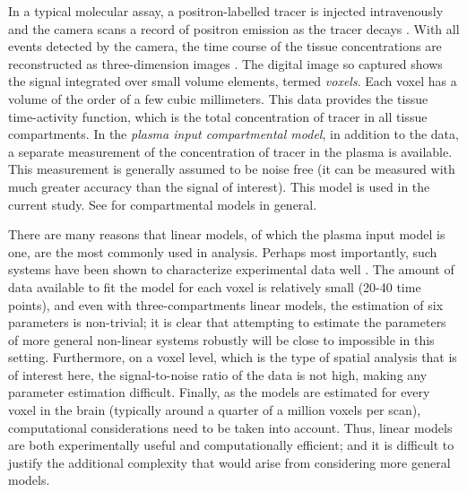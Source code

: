 In a typical molecular assay, a positron-labelled tracer is injected
intravenously and the \pet camera scans a record of positron emission as the
tracer decays \cite{Phelps2000}. With all events detected by the \pet camera,
the time course of the tissue concentrations are reconstructed as
three-dimension images \cite{Kinahan1989}. The digital image so captured
shows the signal integrated over small volume elements, termed \emph{voxels}.
Each voxel has a volume of the order of a few cubic millimeters. This data
provides the tissue time-activity function, which is the total concentration
of tracer in all tissue compartments. In the \emph{plasma input compartmental
model}, in addition to the \pet data, a separate measurement of the
concentration of tracer in the plasma is available. This measurement is
generally assumed to be noise free (it can be measured with much greater
accuracy than the signal of interest). This model is used in the current
study. See \cite{Gunn:2001cx} for \pet compartmental models in general.

There are many reasons that linear \ode models, of which the plasma input
model is one, are the most commonly used in \pet analysis. Perhaps most
importantly, such systems have been shown to characterize \pet experimental
data well \cite{Lammertsma96}. The amount of data available to fit the model
for each voxel is relatively small (20-40 time points), and even with
three-compartments linear \ode models, the estimation of six parameters is
non-trivial; it is clear that attempting to estimate the parameters of more
general non-linear \ode systems robustly will be close to impossible in this
setting. Furthermore, on a voxel level, which is the type of spatial analysis
that is of interest here, the signal-to-noise ratio of the data is not high,
making any parameter estimation difficult. Finally, as the models are
estimated for every voxel in the brain (typically around a quarter of a
million voxels per scan), computational considerations need to be taken into
account. Thus, linear \ode models are both experimentally useful and
computationally efficient; and it is difficult to justify the additional
complexity that would arise from considering more general models.



